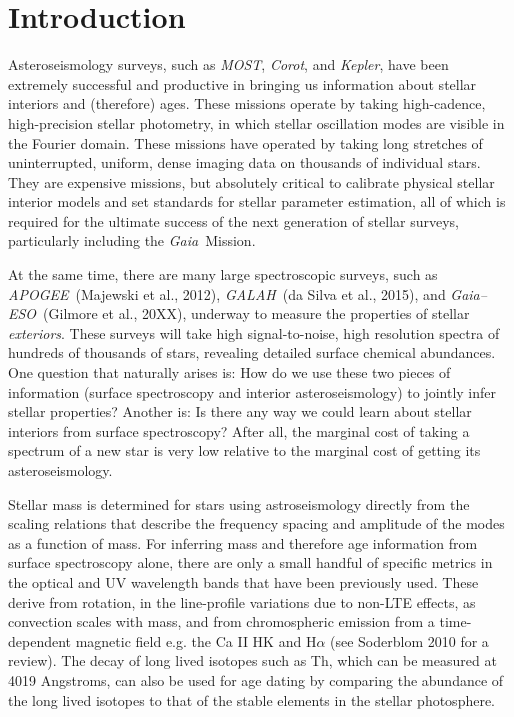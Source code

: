 \documentclass[12pt, preprint]{aastex}
\newcommand{\project}[1]{\textsl{#1}}
\newcommand{\apogee}{\project{APOGEE}}
\newcommand{\corot}{\project{Corot}}
\newcommand{\kepler}{\project{Kepler}}
\newcommand{\gaia}{\project{Gaia}}
\newcommand{\gaiaeso}{\project{Gaia--ESO}}
\newcommand{\galah}{\project{GALAH}}
\newcommand{\most}{\project{MOST}}
\begin{document}

\section{Introduction}\label{sec:Intro}

Asteroseismology surveys, such as \most, \corot, and \kepler, have
been extremely successful and productive in bringing us information
about stellar interiors and (therefore) ages.
These missions operate by taking high-cadence, high-precision stellar
photometry, in which stellar oscillation modes are visible in the
Fourier domain.
These missions have operated by taking long stretches of
uninterrupted, uniform, dense imaging data on thousands of individual
stars.
They are expensive missions, but absolutely critical to calibrate
physical stellar interior models and set standards for stellar
parameter estimation, all of which is required for the ultimate
success of the next generation of stellar surveys, particularly
including the \gaia\ Mission.

At the same time, there are many large spectroscopic surveys, such
as \apogee\ (Majewski et al., 2012), \galah\ (da Silva et al., 2015), and \gaiaeso\ (Gilmore et al., 20XX), underway to measure the properties
of stellar \emph{exteriors}.
These surveys will take high signal-to-noise, high resolution spectra
of hundreds of thousands of stars, revealing detailed surface chemical
abundances.
One question that naturally arises is:
How do we use these two pieces of information (surface spectroscopy
and interior asteroseismology) to jointly infer stellar properties?
Another is:
Is there any way we could learn about stellar interiors from surface
spectroscopy?
After all, the marginal cost of taking a spectrum of
a new star is very low relative to the marginal cost of getting its
asteroseismology.

Stellar mass is determined for stars using astroseismology directly from the scaling relations that describe the frequency spacing and amplitude of the modes as a function of mass. For inferring mass and therefore age information from surface spectroscopy alone, there are only a small handful of specific metrics in the optical and UV wavelength bands that have been previously used. These derive from rotation, in the line-profile variations due to non-LTE effects, as convection scales with mass, and from chromospheric emission from a time-dependent magnetic field e.g. the Ca II HK and H$\alpha$ (see Soderblom 2010 for a review). The decay of long lived isotopes such as Th, which can be measured at 4019 Angstroms, can also be used for age dating by comparing the abundance of the long lived isotopes to that of the stable elements in the stellar photosphere. 
\end{document}
